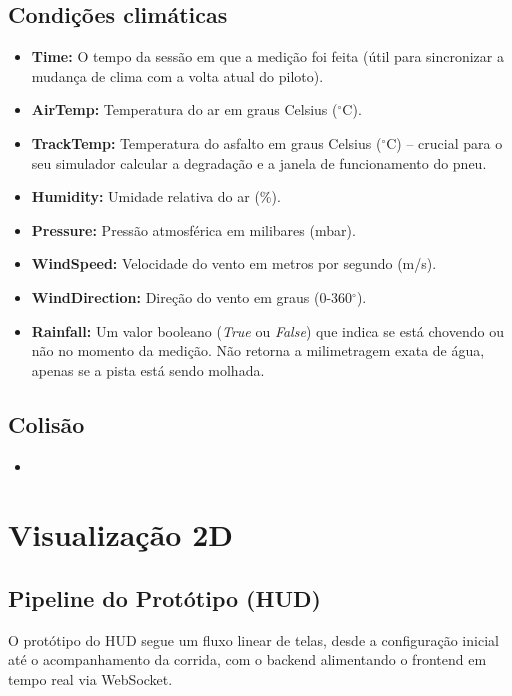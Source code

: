 \documentclass[12pt]{article}
\begin{document}
\subsection{Condições climáticas}
    \begin{itemize}
        \item \textbf{Time:} O tempo da sessão em que a medição foi feita (útil para sincronizar a mudança de clima com a volta atual do piloto).
        \item \textbf{AirTemp:} Temperatura do ar em graus Celsius ($^\circ$C).
        \item \textbf{TrackTemp:} Temperatura do asfalto em graus Celsius ($^\circ$C) -- crucial para o seu simulador calcular a degradação e a janela de funcionamento do pneu.
        \item \textbf{Humidity:} Umidade relativa do ar (\%).
        \item \textbf{Pressure:} Pressão atmosférica em milibares (mbar).
        \item \textbf{WindSpeed:} Velocidade do vento em metros por segundo (m/s).
        \item \textbf{WindDirection:} Direção do vento em graus (0-360$^\circ$).
        \item \textbf{Rainfall:} Um valor booleano (\textit{True} ou \textit{False}) que indica se está chovendo ou não no momento da medição. Não retorna a milimetragem exata de água, apenas se a pista está sendo molhada.
\end{itemize}

\subsection{Colisão}
    \begin{itemize}
        \item
    \end{itemize}

\newpage
\section{Visualização 2D}
\subsection{Pipeline do Protótipo (HUD)}

O protótipo do HUD segue um fluxo linear de telas, desde a configuração inicial até o acompanhamento da corrida, com o backend alimentando o frontend em tempo real via WebSocket.
\end{document}
